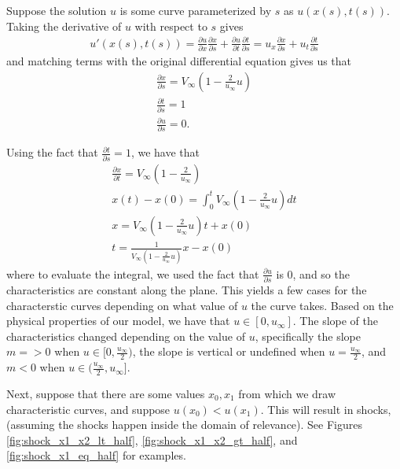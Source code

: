 \documentclass[12pt]{article}
\begin{document}
Suppose the solution $u$ is some curve parameterized by $s$ as $u(x(s), t(s))$. Taking the derivative of $u$ with respect to $s$ gives 
\begin{align*} %
    u'(x(s), t(s)) = \frac{\partial u}{\partial x} \frac{\partial x}{\partial s}  + \frac{\partial u}{\partial t} \frac{\partial t}{\partial s} = u_x \frac{\partial x}{\partial s}  + u_t \frac{\partial t}{\partial s}
\end{align*}
and matching terms with the original differential equation gives us that 
\begin{align*}
    \frac{\partial x}{\partial s}  = V_\infty \left( 1 - \frac{2}{u_\infty} u \right) \\
    \frac{\partial t}{\partial s} = 1 \\
    \frac{\partial u}{\partial s} = 0 .
\end{align*}

Using the fact that $\frac{\partial t}{\partial s} = 1$, we have that 
\begin{align*}
    \frac{\partial x }{\partial t} = V_\infty (1 - \frac{2}{u_\infty} ) \\
    x(t) - x(0) = \int_{0}^{t} V_\infty(1 - \frac{2}{u_\infty} u) dt \\
    x = V_\infty(1 - \frac{2}{u_\infty} u) t + x(0) \\
    t = \frac{1}{  V_\infty(1 - \frac{2}{u_\infty} u) }x - x(0)
\end{align*}
where to evaluate the integral, we used the fact that $\frac{\partial u}{\partial s}$ is $0$, and so the characteristics are constant along the plane. This yields a few cases for the characterstic curves depending on what value of $u$ the curve takes. Based on the physical properties of our model, we have that $u \in [0, u_\infty]$. The slope of the characteristics changed depending on the value of $u$, specifically the slope $m = > 0$ when $u \in [0, \frac{u_\infty}{2}) $, the slope is vertical or undefined when $u = \frac{u_\infty}{2}$, and $m < 0$ when $u \in ( \frac{u_\infty}{2}, u_\infty]$.

Next, suppose that there are some values $x_0, x_1$ from which we draw characteristic curves, and suppose $u(x_0) < u(x_1)$. This will result in shocks, (assuming the shocks happen inside the domain of relevance). See Figures \ref{fig:shock_x1_x2_lt_half}, \ref{fig:shock_x1_x2_gt_half}, and \ref{fig:shock_x1_eq_half} for examples. 
\end{document}
